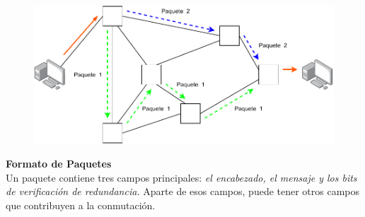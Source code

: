 \begin{itemize}
\begin{itemize}
\begin{figure}[ht!]
\centering
\includegraphics[scale=0.75]{Imagenes/paquete_ejemplo.pdf}
\end{figure}		
		
		\textbf{Formato de Paquetes}\\
		Un paquete contiene tres campos principales: \textit{el encabezado, el mensaje y los bits de verificación de redundancia.} Aparte de esos campos, puede tener otros campos que contribuyen a la conmutación.
				

\end{itemize}
\end{itemize}
